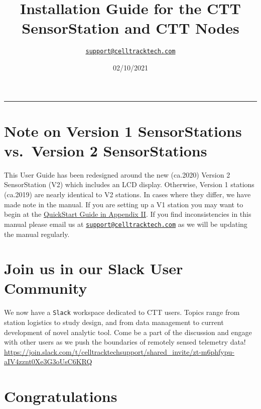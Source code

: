 \documentclass[
]{article}
\title{Installation Guide for the CTT SensorStation and CTT Nodes}
\author{\href{mailto:support@celltracktech.com}{\nolinkurl{support@celltracktech.com}}}
\date{02/10/2021}
\begin{document}
\maketitle

{
\setcounter{tocdepth}{2}
\tableofcontents
}
\begin{center}\rule{0.5\linewidth}{0.5pt}\end{center}

\hypertarget{note-on-version-1-sensorstations-vs.-version-2-sensorstations}{%
\section{Note on Version 1 SensorStations vs.~Version 2
SensorStations}\label{note-on-version-1-sensorstations-vs.-version-2-sensorstations}}

This User Guide has been redesigned around the new (ca.2020) Version 2
SensorStation (V2) which includes an LCD display. Otherwise, Version 1
stations (ca.2019) are nearly identical to V2 stations. In cases where
they differ, we have made note in the manual. If you are setting up a V1
station you may want to begin at the
\protect\hyperlink{V1Quickstart}{QuickStart Guide in Appendix II}. If
you find inconsistencies in this manual please email us at
\href{mailto:support@celltracktech.com}{\nolinkurl{support@celltracktech.com}}
as we will be updating the manual regularly.

\hypertarget{join-us-in-our-slack-user-community}{%
\section{\texorpdfstring{Join us in our \textbf{Slack} User
Community}{Join us in our Slack User Community}}\label{join-us-in-our-slack-user-community}}

We now have a \texttt{Slack} workspace dedicated to CTT users. Topics
range from station logistics to study design, and from data management
to current development of novel analytic tool. Come be a part of the
discussion and engage with other users as we push the boundaries of
remotely sensed telemetry data!
\url{https://join.slack.com/t/celltracktechsupport/shared_invite/zt-m6phfypu-aIV4zznt0Xe3G3oUsC6KRQ}

\hypertarget{congratulations}{%
\section{Congratulations}\label{congratulations}}
\end{document}
